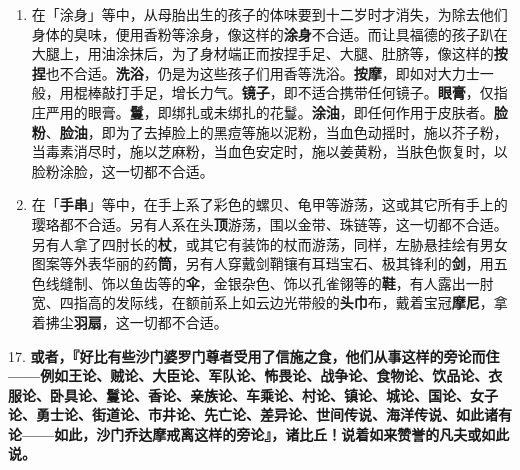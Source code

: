 \begin{enumerate}\item 在「涂身」等中，从母胎出生的孩子的体味要到十二岁时才消失，为除去他们身体的臭味，便用香粉等涂身，像这样的\textbf{涂身}不合适。而让具福德的孩子趴在大腿上，用油涂抹后，为了身材端正而按捏手足、大腿、肚脐等，像这样的\textbf{按捏}也不合适。\textbf{洗浴}，仍是为这些孩子们用香等洗浴。\textbf{按摩}，即如对大力士一般，用棍棒敲打手足，增长力气。\textbf{镜子}，即不适合携带任何镜子。\textbf{眼膏}，仅指庄严用的眼膏。\textbf{鬘}，即绑扎或未绑扎的花鬘。\textbf{涂油}，即任何作用于皮肤者。\textbf{脸粉}、\textbf{脸油}，即为了去掉脸上的黑痘等施以泥粉，当血色动摇时，施以芥子粉，当毒素消尽时，施以芝麻粉，当血色安定时，施以姜黄粉，当肤色恢复时，以脸粉涂脸，这一切都不合适。
\item 在「\textbf{手串}」等中，在手上系了彩色的螺贝、龟甲等游荡，这或其它所有手上的璎珞都不合适。另有人系在头\textbf{顶}游荡，围以金带、珠链等，这一切都不合适。另有人拿了四肘长的\textbf{杖}，或其它有装饰的杖而游荡，同样，左胁悬挂绘有男女图案等外表华丽的药\textbf{筒}，另有人穿戴剑鞘镶有耳珰宝石、极其锋利的\textbf{剑}，用五色线缝制、饰以鱼齿等的\textbf{伞}，金银杂色、饰以孔雀翎等的\textbf{鞋}，有人露出一肘宽、四指高的发际线，在额前系上如云边光带般的\textbf{头巾}布，戴着宝冠\textbf{摩尼}，拿着拂尘\textbf{羽扇}，这一切都不合适。\end{enumerate}

{\Large 17.} \textbf{或者，『好比有些沙门婆罗门尊者受用了信施之食，他们从事这样的旁论而住——例如王论、贼论、大臣论、军队论、怖畏论、战争论、食物论、饮品论、衣服论、卧具论、鬘论、香论、亲族论、车乘论、村论、镇论、城论、国论、女子论、勇士论、街道论、市井论、先亡论、差异论、世间传说、海洋传说、如此诸有论——如此，沙门乔达摩戒离这样的旁论』，诸比丘！说着如来赞誉的凡夫或如此说。}

